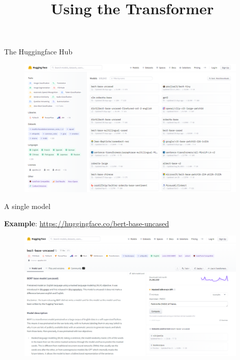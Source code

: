 



\newcommand{\titlefigure}{figure/sesamestreet.jpeg}
\newcommand{\learninggoals}{
\item Huggingface model hub
\item Grasp the difficulty of model choice}

\title{Using the Transformer}
\date{}




\begin{frame}{The Huggingface Hub}

\vfill

	\begin{figure}
		\centering
		\includegraphics[width = 11cm]{figure/hf-models.png}
	\end{figure}
	
\vfill

\end{frame}


\begin{frame}{A single model}

\vfill

\textbf{Example}: \url{https://huggingface.co/bert-base-uncased}

	\begin{figure}
		\centering
		\includegraphics[width = 11cm]{figure/hf-example.png}
	\end{figure}
	
\vfill

\end{frame}


